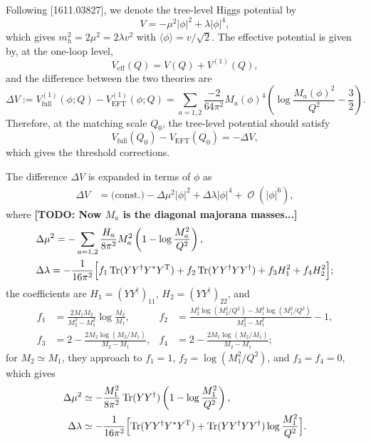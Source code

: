 \documentclass[a4paper,11pt]{scrartcl}
\numberwithin{equation}{section}
\newcommand\w[1]{_{\mathrm{#1}}}
\DeclareMathOperator{\Order}{\mathcal{O}}
\DeclareMathOperator{\Tr}{\mathrm{Tr}}
\newcommand\vev[1]{\langle#1\rangle}
\newcommand{\TODO}[1]{{\textbf{\small \color{red} [TODO: #1]}}}
\newcommand{\trans}{^{\mathrm T}}
\begin{document}
Following [1611.03827], we denote the tree-level Higgs potential by
\begin{equation}
 V = -\mu^2|\phi|^2 + \lambda|\phi|^4,
\end{equation}
which gives $m_h^2 = 2\mu^2 = 2\lambda v^2$ with $\vev{\phi}=v/\sqrt{2}$.
The effective potential is given by, at the one-loop level,
\begin{equation}
 V\w{eff}(Q) = V(Q) + V^{(1)}(Q),
\end{equation}
and the difference between the two theories are
\begin{equation}
\Delta V := V\w{full}^{(1)}(\phi;Q) - V\w{EFT}^{(1)}(\phi;Q)
= \sum_{a=1,2}\frac{-2}{64\pi^2}M_a(\phi)^4\left(\log\frac{M_a(\phi)^2}{Q^2}-\frac32\right).
\end{equation}
Therefore, at the matching scale $Q_0$, the tree-level potential should satisfy
\begin{equation}
 V\w{full}(Q_0) - V\w{EFT}(Q_0) = -\Delta V,
\end{equation}
which gives the threshold corrections.

The difference $\Delta V$ is expanded in terms of $\phi$ as
\begin{align}
 \Delta V
&= \text{(const.)} - \Delta \mu^2 |\phi|^2 + \Delta \lambda |\phi|^4 + \Order\left(|\phi|^6\right),
\end{align}
where
\TODO{Now $M_a$ is the diagonal majorana masses...}
\begin{align}
 &\Delta\mu^2= -\sum_{a=1,2}\frac{H_a}{8\pi^2}M_a^2\left(1-\log\frac{M_a^2}{Q^2}\right),
\\
 &\Delta\lambda
=
-\frac{1}{16\pi^2}
\Bigl[f_1 \Tr(Y Y^\dagger Y^*Y\trans)
+f_2\Tr(YY^\dagger YY^\dagger)
+f_3H_1^2+f_4H_2^2
\Bigr];
\end{align}
the coefficients are $H_1 = (YY^\dagger)_{11}$, $H_2 = (YY^\dagger)_{22}$, and
\begin{align*}
 f_1&=\frac{2M_1 M_2}{M_2^2-M_1^2}\log\frac{M_2}{M_1},&
 f_2&=\frac{M_2^2\log(M_2^2/Q^2) - M_1^2\log(M_1^2/Q^2)}{M_2^2 - M_1^2} - 1,\\
 f_3 &= 2-\frac{2M_2\log(M_2/M_1)}{M_2-M_1},&
 f_4 &= 2-\frac{2M_1\log(M_2/M_1)}{M_2-M_1};
\end{align*}
for $M_2\simeq M_1$, they approach to $f_1=1$, $f_2=\log({M_1^2}/{Q^2})$, and $f_3=f_4=0$, which gives
\begin{align}
 \Delta \mu^2
&\simeq -\frac{M_1^2}{8\pi^2}\Tr(YY^\dagger)\left(1-\log\frac{M_1^2}{Q^2}\right),\\
 \Delta \lambda
&\simeq
-\frac{1}{16\pi^2}\Bigl[
 \Tr(Y Y^\dagger Y^*Y\trans) + \Tr(YY^\dagger YY^\dagger)\log\frac{M_1^2}{Q^2}
\Bigr].
\end{align}
\end{document}
